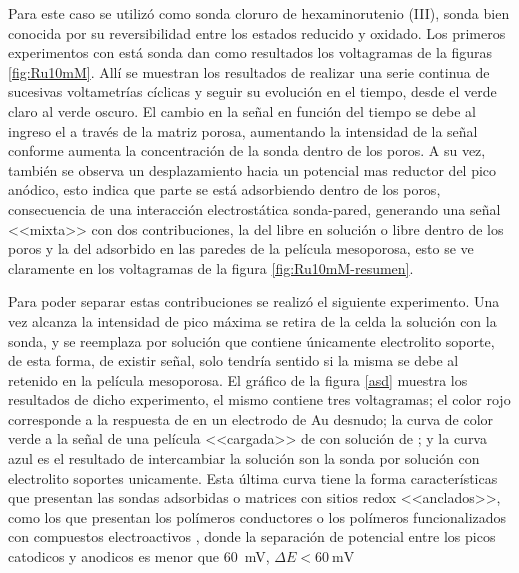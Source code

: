 	Para este caso se utilizó como sonda cloruro de hexaminorutenio (III), sonda bien conocida por su reversibilidad entre los estados reducido y oxidado. Los primeros experimentos con está sonda dan como resultados los voltagramas de la figuras \ref{fig:Ru10mM}. Allí se muestran los resultados de realizar una serie continua de sucesivas voltametrías cíclicas y seguir su evolución en el tiempo, desde el verde claro al verde oscuro. El cambio en la señal en función del tiempo se debe al ingreso el \aminorutenio\space a través de la matriz porosa, aumentando la intensidad de la señal conforme aumenta la concentración de la sonda dentro de los poros. A su vez, también se observa un desplazamiento hacia un potencial mas reductor del pico anódico, esto indica que parte \aminorutenio\space se está adsorbiendo dentro de los poros, consecuencia de una interacción electrostática sonda-pared, generando una señal <<mixta>> con dos contribuciones, la del \aminorutenio\space libre en solución o libre dentro de los poros y la del adsorbido en las paredes de la película mesoporosa, esto se ve claramente en los voltagramas de la figura \ref{fig:Ru10mM-resumen}.

	Para poder separar estas contribuciones se realizó el siguiente experimento. Una vez alcanza la intensidad de pico máxima se retira de la celda la solución con la sonda, y se reemplaza por solución que contiene únicamente electrolito soporte, de esta forma, de existir señal, solo tendría sentido si la misma se debe al \aminorutenio\space retenido en la película mesoporosa. El gráfico de la figura \ref{asd} muestra los resultados de dicho experimento, el mismo contiene tres voltagramas; el color rojo corresponde a la respuesta de \aminorutenio\space en un electrodo de Au desnudo; la curva de color verde a la señal de una película <<cargada>> de \aminorutenio\space con solución de \aminorutenio; y la curva azul es el resultado de intercambiar la solución son la sonda por solución con electrolito soportes unicamente. Esta última curva tiene la forma características que presentan las sondas adsorbidas o matrices con sitios redox <<anclados>>, como los que presentan los polímeros conductores \cite{Ybarra2005} o los polímeros funcionalizados con compuestos electroactivos \cite{Rohlfing2005,Vila2015}, donde la separación de potencial entre los picos catodicos y anodicos es menor que \SI{60}{\milli\volt}, $\Delta E < \SI{60}{\milli\volt}$ 


